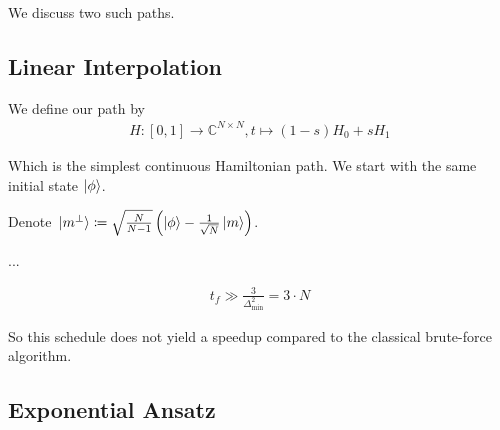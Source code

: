 \documentclass[10pt]{amsart}
\theoremstyle{definition}
\theoremstyle{remark}
\begin{document}
    \phantom{}
    
    We discuss two such paths.

    \subsection{Linear Interpolation}

    

    We define our path by
    \begin{align}
        H\colon [0, 1] \to \mathbb{C}^{N \times N}, t \mapsto (1-s)H_0+sH_1
    \end{align}

    Which is the simplest continuous Hamiltonian path. We start with the same initial state \(\ket{\phi}\).
    
    Denote \(\ket*{m^\perp} \coloneqq \sqrt{\frac{N}{N-1}}\left(\ket{\phi}-\frac{1}{\sqrt{N}}\ket{m}\right)\).

    ...

    \begin{align}
        t_f \gg \frac{3}{\Delta_{\text{min}}^2} = 3 \cdot N
    \end{align}

    So this schedule does not yield a speedup compared to the classical brute-force algorithm.

    \subsection{Exponential Ansatz}

    \printbibliography{}
\end{document}
